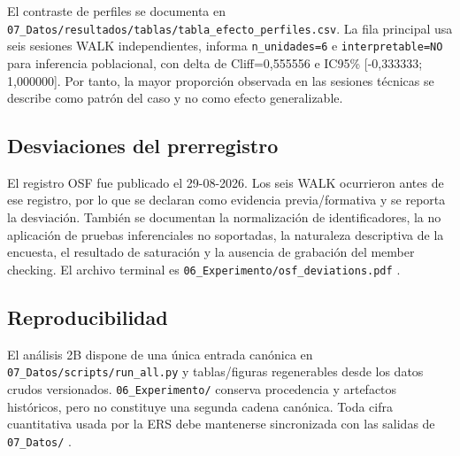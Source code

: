 \documentclass[11pt,a4paper,twoside]{article}
\begin{document}
El contraste de perfiles se documenta en \texttt{07\_Datos/resultados/tablas/tabla\_efecto\_perfiles.csv}. La fila principal usa seis sesiones WALK independientes, informa \texttt{n\_unidades=6} e \texttt{interpretable=NO} para inferencia poblacional, con delta de Cliff=0,555556 e IC95\% [-0,333333; 1,000000]. Por tanto, la mayor proporción observada en las sesiones técnicas se describe como patrón del caso y no como efecto generalizable.

\subsection{Desviaciones del prerregistro}
El registro OSF fue publicado el 29-08-2026. Los seis WALK ocurrieron antes de ese registro, por lo que se declaran como evidencia previa/formativa y se reporta la desviación. También se documentan la normalización de identificadores, la no aplicación de pruebas inferenciales no soportadas, la naturaleza descriptiva de la encuesta, el resultado de saturación y la ausencia de grabación del member checking. El archivo terminal es \texttt{06\_Experimento/osf\_deviations.pdf} \cite{nosek2018}.

\subsection{Reproducibilidad}
El análisis 2B dispone de una única entrada canónica en \texttt{07\_Datos/scripts/run\_all.py} y tablas/figuras regenerables desde los datos crudos versionados. \texttt{06\_Experimento/} conserva procedencia y artefactos históricos, pero no constituye una segunda cadena canónica. Toda cifra cuantitativa usada por la ERS debe mantenerse sincronizada con las salidas de \texttt{07\_Datos/} \cite{sandve2013,wilkinson2016}.
\end{document}
